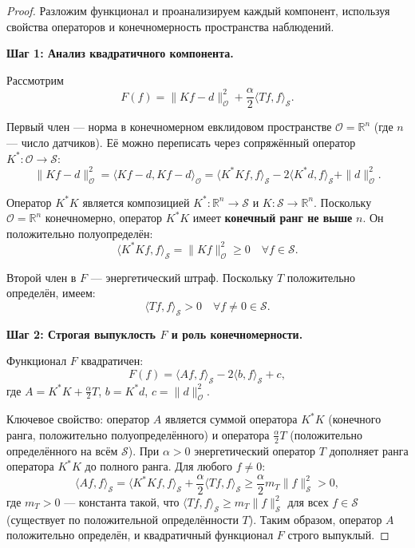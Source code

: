 \documentclass[sn-mathphys-num]{bst/sn-jnl}
\theoremstyle{thmstylethree}
\theoremstyle{thmstyletwo}
\theoremstyle{thmstyleone}
\begin{document}
\begin{proof}
Разложим функционал и проанализируем каждый компонент, используя свойства операторов и 
конечномерность пространства наблюдений.

\textbf{Шаг 1: Анализ квадратичного компонента.}

Рассмотрим
\begin{equation}
    F(f)=\|K f - d\|_{\mathcal{O}}^2 + \frac{\alpha}{2}\langle T f, f\rangle_{\mathcal{S}}.
\end{equation}

Первый член — норма в конечномерном евклидовом пространстве $\mathcal{O} = \mathbb{R}^n$ (где $n$ — число датчиков). 
Её можно переписать через сопряжённый оператор $K^*:\mathcal{O}\to\mathcal{S}$:
\begin{equation}
    \|Kf-d\|_{\mathcal{O}}^2 = \langle Kf-d, Kf-d\rangle_{\mathcal{O}} = \langle K^*Kf, f\rangle_{\mathcal{S}} - 2\langle K^*d, f\rangle_{\mathcal{S}} + \|d\|_{\mathcal{O}}^2.
\end{equation}

Оператор $K^*K$ является композицией $K^*:\mathbb{R}^n\to\mathcal{S}$ и $K:\mathcal{S}\to\mathbb{R}^n$. Поскольку $\mathcal{O}=\mathbb{R}^n$
конечномерно, оператор $K^*K$ имеет \textbf{конечный ранг не выше} $n$. Он положительно полуопределён:
\begin{equation}
    \langle K^*K f, f\rangle_{\mathcal{S}} = \|Kf\|_{\mathcal{O}}^2 \geq 0 \quad \forall f \in \mathcal{S}.
\end{equation}

Второй член в $F$ — энергетический штраф. Поскольку $T$ положительно определён, имеем:
\begin{equation}
    \langle T f, f\rangle_{\mathcal{S}} > 0 \quad \forall f \neq 0 \in \mathcal{S}.
\end{equation}

\textbf{Шаг 2: Строгая выпуклость $F$ и роль конечномерности.}

Функционал $F$ квадратичен:
\begin{equation}
    F(f) = \langle A f, f\rangle_{\mathcal{S}} - 2\langle b, f\rangle_{\mathcal{S}} + c,
\end{equation}
где $A = K^*K + \frac{\alpha}{2}T$, $b = K^*d$, $c = \|d\|_{\mathcal{O}}^2$.

Ключевое свойство: оператор $A$ является суммой оператора $K^*K$ (конечного ранга, положительно полуопределённого) и оператора $\frac{\alpha}{2}T$ 
(положительно определённого на всём $\mathcal{S}$). При $\alpha > 0$ энергетический оператор $T$ дополняет ранга оператора $K^*K$ до полного ранга.
 Для любого $f \neq 0$:
\begin{equation}
    \langle A f, f\rangle_{\mathcal{S}} = \langle K^*K f, f\rangle_{\mathcal{S}} + \frac{\alpha}{2}\langle T f, f\rangle_{\mathcal{S}} \geq \frac{\alpha}{2} m_T \|f\|_{\mathcal{S}}^2 > 0,
\end{equation}
где $m_T > 0$ — константа такой, что $\langle T f, f\rangle_{\mathcal{S}} \geq m_T \|f\|_{\mathcal{S}}^2$ для всех $f \in \mathcal{S}$ (существует по положительной определённости $T$). Таким образом, оператор $A$ положительно определён, и квадратичный функционал $F$ строго выпуклый.


\end{proof}
\end{document}
